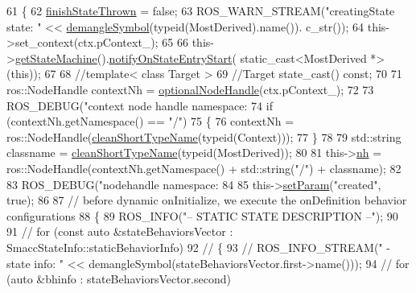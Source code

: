 \begin{DoxyCode}
61   \{
62     \hyperlink{classsmacc_1_1SmaccState_a6c40f733c35ddfb9ae2a2f8e9bab07d3}{finishStateThrown} = \textcolor{keyword}{false};
63     ROS\_WARN\_STREAM(\textcolor{stringliteral}{"creatingState state: "} << \hyperlink{namespacesmacc_a458f5e70d468824fbcd66cc7729deaa8}{demangleSymbol}(\textcolor{keyword}{typeid}(MostDerived).name()).
      c\_str());
64     this->set\_context(ctx.pContext\_);
65 
66     this->\hyperlink{classsmacc_1_1SmaccState_afc39f8e0ca4001b2159a100da2fccd0e}{getStateMachine}().\hyperlink{classsmacc_1_1ISmaccStateMachine_aeec54e997d715b105ebfeb5caadc4fbf}{notifyOnStateEntryStart}(
      static\_cast<MostDerived *>(\textcolor{keyword}{this}));
67 
68     \textcolor{comment}{//template< class Target >}
69     \textcolor{comment}{//Target state\_cast() const;}
70 
71     ros::NodeHandle contextNh = \hyperlink{namespacesmacc_aaf5c46d2834edc391571efd0acd05e6f}{optionalNodeHandle}(ctx.pContext\_);
72 
73     ROS\_DEBUG(\textcolor{stringliteral}{"context node handle namespace: %
74     \textcolor{keywordflow}{if} (contextNh.getNamespace() == \textcolor{stringliteral}{"/"})
75     \{
76       contextNh = ros::NodeHandle(\hyperlink{namespacesmacc_a09b297b1cdb9aae93a958f323431464a}{cleanShortTypeName}(\textcolor{keyword}{typeid}(Context)));
77     \}
78 
79     std::string classname = \hyperlink{namespacesmacc_a09b297b1cdb9aae93a958f323431464a}{cleanShortTypeName}(\textcolor{keyword}{typeid}(MostDerived));
80 
81     this->\hyperlink{classsmacc_1_1ISmaccState_a13fe6e6abfdb87996402189d44b78494}{nh} = ros::NodeHandle(contextNh.getNamespace() + std::string(\textcolor{stringliteral}{"/"}) + classname);
82 
83     ROS\_DEBUG(\textcolor{stringliteral}{"nodehandle namespace: %
84 
85     this->\hyperlink{classsmacc_1_1ISmaccState_a0b6c531ca8c446052022308548f55b92}{setParam}(\textcolor{stringliteral}{"created"}, \textcolor{keyword}{true});
86 
87     \textcolor{comment}{// before dynamic onInitialize, we execute the onDefinition behavior configurations}
88     \{
89       ROS\_INFO(\textcolor{stringliteral}{"-- STATIC STATE DESCRIPTION --"});
90 
91       \textcolor{comment}{// for (const auto &stateBehaviorsVector : SmaccStateInfo::staticBehaviorInfo)}
92       \textcolor{comment}{// \{}
93       \textcolor{comment}{//   ROS\_INFO\_STREAM(" - state info: " << demangleSymbol(stateBehaviorsVector.first->name()));}
94       \textcolor{comment}{//   for (auto &bhinfo : stateBehaviorsVector.second)}
}}
\end{DoxyCode}
